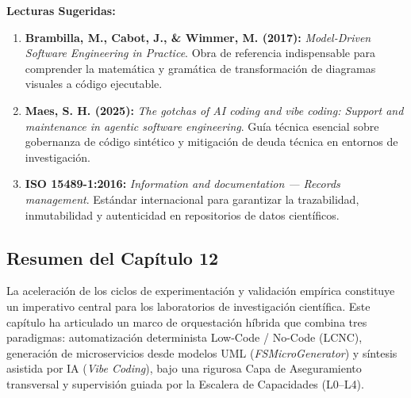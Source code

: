 \vspace{0.3cm}
\textbf{Lecturas Sugeridas:}\\[0.2cm]
\begin{enumerate}[leftmargin=1.5em, itemsep=0.15cm, topsep=0.1cm, parsep=0pt]
    \item \textbf{Brambilla, M., Cabot, J., \& Wimmer, M. (2017):} \textit{Model-Driven Software Engineering in Practice}. Obra de referencia indispensable para comprender la matemática y gramática de transformación de diagramas visuales a código ejecutable.
    \item \textbf{Maes, S. H. (2025):} \textit{The gotchas of AI coding and vibe coding: Support and maintenance in agentic software engineering}. Guía técnica esencial sobre gobernanza de código sintético y mitigación de deuda técnica en entornos de investigación.
    \item \textbf{ISO 15489-1:2016:} \textit{Information and documentation --- Records management}. Estándar internacional para garantizar la trazabilidad, inmutabilidad y autenticidad en repositorios de datos científicos.
\end{enumerate}

\newpage
{}
\subsection*{Resumen del Capítulo 12}

La aceleración de los ciclos de experimentación y validación empírica constituye un imperativo central para los laboratorios de investigación científica. Este capítulo ha articulado un marco de orquestación híbrida que combina tres paradigmas: automatización determinista Low-Code / No-Code (LCNC), generación de microservicios desde modelos UML (\textit{FSMicroGenerator}) y síntesis asistida por IA (\textit{Vibe Coding}), bajo una rigurosa Capa de Aseguramiento transversal y supervisión guiada por la Escalera de Capacidades (L0--L4).

